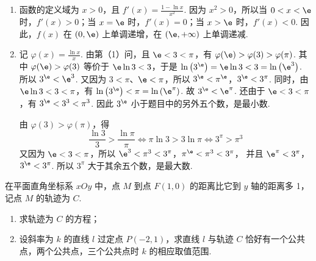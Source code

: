 \begin{solution}
\begin{enumerate}
\item 函数的定义域为 \(x>0\)，且 \(f'(x)=\frac{1-\ln x}{x^2}\).
因为 \(x^2>0\)，所以当 \(0<x<\e\) 时，\(f'(x)>0\)；当 \(x=\e\) 时，\(f'(x)=0\)；当 \(x>\e\) 时，\(f'(x)<0\). 因此，\(f(x)\) 在 \((0,\e)\) 上单调递增，在 \((\e,+\infty)\) 上单调递减.

\item 记 \(\varphi(x)=\frac{\ln x}{x}\). 由第（1）问，且 \(\e<3<\pi\)，有 \(\varphi(\e)>\varphi(3)>\varphi(\pi)\). 其中 \(\varphi(\e)>\varphi(3)\) 等价于 \(\e\ln3<3\)，于是 \(\ln\left(3^{\e}\right)=\e\ln3<3=\ln\left(\e^3\right)\).
所以 \(3^{\e}<\e^3\). 又因为 \(3<\pi\)、\(\e<\pi\)，所以 \(3^{\e}<\pi^{\e}\)，\(3^{\e}<3^{\pi}\).
同时，由 \(\e\ln3<3<\pi\)，有 \(\ln\left(3^{\e}\right)<\pi=\ln\left(\e^{\pi}\right)\). 故 \(3^{\e}<\e^{\pi}\). 还由于 \(\e<3<\pi\)，有 \(3^{\e}<3^3<\pi^3\).
因此 \(3^{\e}\) 小于题目中的另外五个数，是最小数.

由 \(\varphi(3)>\varphi(\pi)\)，得
\[
\frac{\ln3}{3}>\frac{\ln\pi}{\pi}
\Longleftrightarrow \pi\ln3>3\ln\pi
\Longleftrightarrow 3^{\pi}>\pi^3
\]
又因为 \(\e<3<\pi\)，所以 \(\e^3<\pi^3<3^{\pi}\)，\(\pi^{\e}<\pi^3<3^{\pi}\)，
并且 \(\e^{\pi}<3^{\pi}\)，\(3^{\e}<3^{\pi}\). 所以 \(3^{\pi}\) 大于其余五个数，是最大数.
\end{enumerate}
\end{solution}

\begin{problem}
在平面直角坐标系 \(xOy\) 中，点 \(M\) 到点 \(F(1,0)\) 的距离比它到 \(y\) 轴的距离多 1，记点 \(M\) 的轨迹为 \(C\).
\begin{enumerate}
\item 求轨迹为 \(C\) 的方程；
\item 设斜率为 \(k\) 的直线 \(l\) 过定点 \(P(-2,1)\)，求直线 \(l\) 与轨迹 \(C\) 恰好有一个公共点，两个公共点，三个公共点时 \(k\) 的相应取值范围.
\end{enumerate}
\end{problem}

